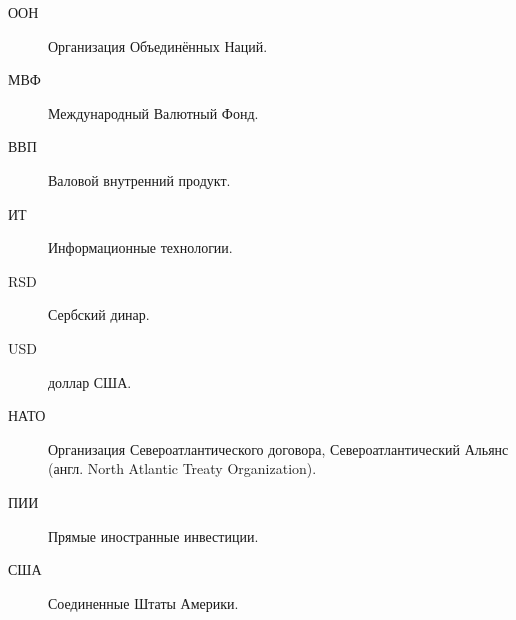 \Abbreviations %
\begin{description}
\item[ООН] Организация Объединённых Наций.
\item[МВФ] Международный Валютный Фонд.
\item[ВВП] Валовой внутренний продукт.
\item[ИТ] Информационные технологии.
\item[RSD] Сербский динар.
\item[USD] доллар США.
\item[НАТО] Организация Североатлантического договора, Североатлантический Альянс (англ. North Atlantic Treaty Organization).
\item[ПИИ] Прямые иностранные инвестиции.
\item[США] Соединенные Штаты Америки.
\end{description}

